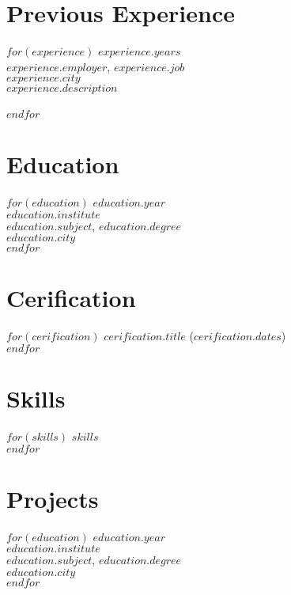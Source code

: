 \documentclass[$fontsize$, a4paper]{article}
\begin{document}
\vspace{-15pt}

\section*{Previous Experience}
\noindent
$for(experience)$
\footnotesize{$experience.years$}\\
\textsc{$experience.employer$}, \emph{$experience.job$}\\
$experience.city$\\[.2cm]
$experience.description$\\\\
$endfor$

\vspace{-15pt}

\begin{multicols}{2}

\section*{Education}
\noindent
$for(education)$
\footnotesize{$education.year$}\\
\emph{$education.institute$}\\
\textbf{$education.subject$}, $education.degree$\\
$education.city$\\[.2cm]
$endfor$

\columnbreak

\section*{Cerification}
$for(cerification)$
$cerification.title$ ($cerification.dates$)\\
$endfor$

\section*{Skills}
$for(skills)$
$skills$\\
$endfor$

\end{multicols}




\pagebreak

\section*{Projects}
\noindent
$for(education)$
\footnotesize{$education.year$}\\
\emph{$education.institute$}\\
\textbf{$education.subject$}, $education.degree$\\
$education.city$\\[.2cm]
$endfor$
\end{document}
